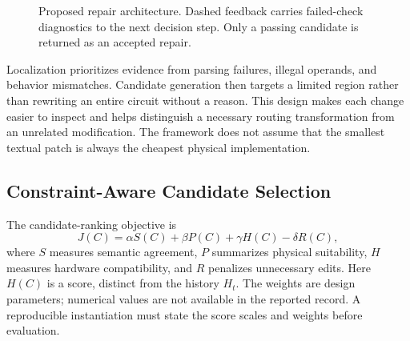 \documentclass[conference]{IEEEtran}
\begin{document}
\begin{figure}[t]
\centering
{}
\caption{Proposed repair architecture. Dashed feedback carries failed-check diagnostics to the next decision step. Only a passing candidate is returned as an accepted repair.}
\label{fig:architecture}
\end{figure}

Localization prioritizes evidence from parsing failures, illegal operands, and behavior mismatches. Candidate generation then targets a limited region rather than rewriting an entire circuit without a reason. This design makes each change easier to inspect and helps distinguish a necessary routing transformation from an unrelated modification. The framework does not assume that the smallest textual patch is always the cheapest physical implementation.

\subsection{Constraint-Aware Candidate Selection}
The candidate-ranking objective is
\begin{equation}
 J(C)=\alpha S(C)+\beta P(C)+\gamma H(C)-\delta R(C),
\label{eq:objective}
\end{equation}
where $S$ measures semantic agreement, $P$ summarizes physical suitability, $H$ measures hardware compatibility, and $R$ penalizes unnecessary edits. Here $H(C)$ is a score, distinct from the history $H_t$. The weights are design parameters; numerical values are not available in the reported record. A reproducible instantiation must state the score scales and weights before evaluation.
\end{document}
